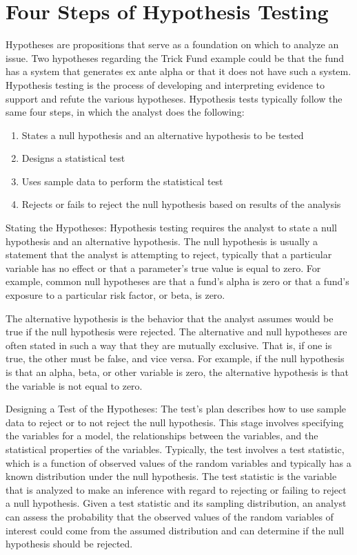 \documentclass[11pt]{article}
\begin{document}
\section*{Four Steps of Hypothesis Testing}
Hypotheses are propositions that serve as a foundation on which to analyze an issue. Two hypotheses regarding the Trick Fund example could be that the fund has a system that generates ex ante alpha or that it does not have such a system. Hypothesis testing is the process of developing and interpreting evidence to support and refute the various hypotheses. Hypothesis tests typically follow the same four steps, in which the analyst does the following:

\begin{enumerate}
  \item States a null hypothesis and an alternative hypothesis to be tested

  \item Designs a statistical test

  \item Uses sample data to perform the statistical test

  \item Rejects or fails to reject the null hypothesis based on results of the analysis

\end{enumerate}

Stating the Hypotheses: Hypothesis testing requires the analyst to state a null hypothesis and an alternative hypothesis. The null hypothesis is usually a statement that the analyst is attempting to reject, typically that a particular variable has no effect or that a parameter's true value is equal to zero. For example, common null hypotheses are that a fund's alpha is zero or that a fund's exposure to a particular risk factor, or beta, is zero.

The alternative hypothesis is the behavior that the analyst assumes would be true if the null hypothesis were rejected. The alternative and null hypotheses are often stated in such a way that they are mutually exclusive. That is, if one is true, the other must be false, and vice versa. For example, if the null hypothesis is that an alpha, beta, or other variable is zero, the alternative hypothesis is that the variable is not equal to zero.

Designing a Test of the Hypotheses: The test's plan describes how to use sample data to reject or to not reject the null hypothesis. This stage involves specifying the variables for a model, the relationships between the variables, and the statistical properties of the variables. Typically, the test involves a test statistic, which is a function of observed values of the random variables and typically has a known distribution under the null hypothesis. The test statistic is the variable that is analyzed to make an inference with regard to rejecting or failing to reject a null hypothesis. Given a test statistic and its sampling distribution, an analyst can assess the probability that the observed values of the random variables of interest could come from the assumed distribution and can determine if the null hypothesis should be rejected.
\end{document}
